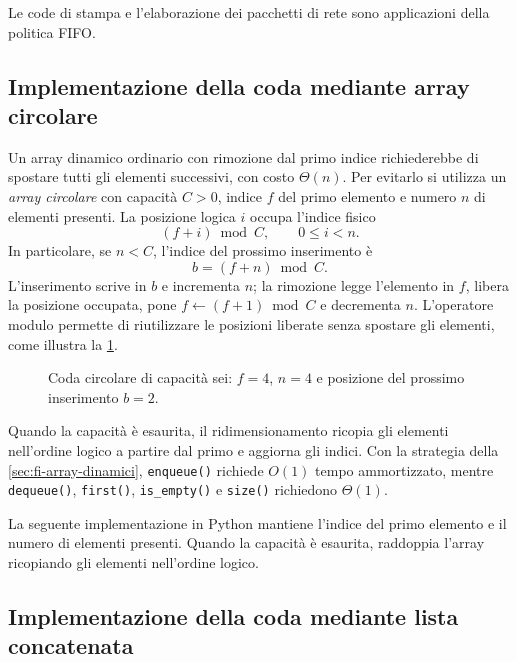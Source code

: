 Le code di stampa e l'elaborazione dei pacchetti di rete sono
applicazioni della politica FIFO.

\subsection{Implementazione della coda mediante array circolare}
\label{sec:fi-coda-circolare}

Un array dinamico ordinario con rimozione dal primo indice
richiederebbe di spostare tutti gli elementi successivi, con
costo \(\Theta(n)\). Per evitarlo si utilizza un
\emph{array circolare} con capacità \(C>0\), indice \(f\) del
primo elemento e numero \(n\) di elementi presenti.
La posizione logica \(i\) occupa l'indice fisico
\[
  (f+i)\bmod C,
  \qquad 0\le i<n.
\]
In particolare, se \(n<C\), l'indice del prossimo inserimento è
\[
  b=(f+n)\bmod C.
\]
L'inserimento scrive in \(b\) e incrementa \(n\); la rimozione
legge l'elemento in \(f\), libera la posizione occupata, pone
\(f\gets(f+1)\bmod C\) e decrementa \(n\). L'operatore modulo
permette di riutilizzare le posizioni liberate senza spostare
gli elementi, come illustra la \cref{fig:fi-coda-circolare}.

\begin{figure}[htbp]
  \centering
  
  \caption{Coda circolare di capacità sei: \(f=4\), \(n=4\)
  e posizione del prossimo inserimento \(b=2\).}
  \label{fig:fi-coda-circolare}
\end{figure}

Quando la capacità è esaurita, il ridimensionamento ricopia
gli elementi nell'ordine logico a partire dal primo e aggiorna
gli indici. Con la strategia della \cref{sec:fi-array-dinamici},
\texttt{enqueue()} richiede \(O(1)\) tempo ammortizzato, mentre
\texttt{dequeue()}, \texttt{first()}, \texttt{is\_empty()}
e \texttt{size()} richiedono \(\Theta(1)\).

La seguente implementazione in Python mantiene l'indice del
primo elemento e il numero di elementi presenti. Quando la
capacità è esaurita, raddoppia l'array ricopiando gli elementi
nell'ordine logico.



\subsection{Implementazione della coda mediante lista concatenata}
\label{sec:fi-coda-concatenata}

